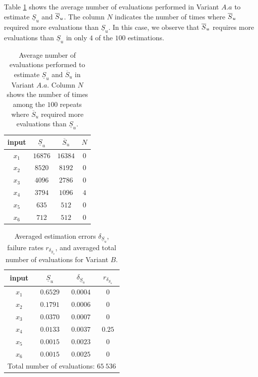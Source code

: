 Table \ref{comparison.bratley} shows the average number of evaluations performed in Variant $A.a$ to estimate $\underline{S}_u$ and $\ov{$S$}_u$. The column $N$ indicates the number of times where $\ov{$S$}_u$ required more evaluations than $\underline{S}_u$. In this case, we observe that $\ov{$S$}_u$ requires more evaluations than $\underline{S}_u$ in only $4$ of the $100$ estimations.
\begin{table}[t]
\caption{Average number of evaluations performed to estimate $\underline{S}_u$ and $\overline{S}_u$ in Variant $A.a$. Column $N$ shows the number of times among the $100$ repeats where $\overline{S}_u$ required more evaluations than $\underline{S}_u$.}
\centering
\begin{tabular}{cccc}
\hline
 input & $\underline{S}_u$ & $\overline{S}_u$ & $N$ \\ \hline
 $x_1$ & $16876$ & $16384$ & $0$ \\  \hline
 $x_2$ & $8520$ & $8192$ & $0$ \\  \hline
 $x_3$ & $4096$ & $2786$ & $0$ \\  \hline
 $x_4$ & $3794$ & $1096$ & $4$ \\  \hline
 $x_5$ & $635$ & $512$ & $0$ \\  \hline
 $x_6$ & $712$ & $512$ & $0$ \\ 
\hline 
\end{tabular}
\label{comparison.bratley}
\end{table}
\begin{table}[t]
\caption{Averaged estimation errors $\delta_{\underline{S}_u}$, failure rates $r_{\delta_{\underline{S}_u}}$, and averaged total number of evaluations for Variant $B$.}
\centering
\begin{tabular}{cccc}
\hline
 input & $\underline{S}_u$ & $\delta_{\underline{S}_u}$ & $r_{\delta_{\underline{S}_u}}$ \\ \hline
 $x_1$ & $0.6529$ &  $0.0004$ & $0$ \\ \hline
 $x_2$ & $0.1791$ &  $0.0006$ & $0$ \\ \hline
 $x_3$ & $0.0370$ &  $0.0007$ & $0$ \\ \hline
 $x_4$ & $0.0133$ &  $0.0037$ & $0.25$    \\ \hline
 $x_5$ & $0.0015$ & $0.0023$ & $0$  \\ \hline
 $x_6$ & $0.0015$ & $0.0025$ & $0$  \\ \hline \hline
\multicolumn{4}{l}{Total number of evaluations: $65 \ 536$}\\ \hline 
\end{tabular}
\label{res.bratley.B}
\end{table}

